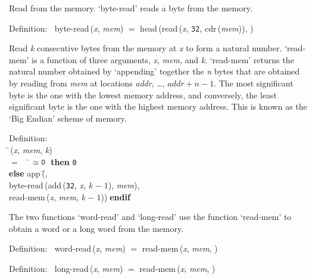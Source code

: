 Read from the memory.
 `byte-read' reads a byte from the memory.
\begin{tabbing}{\sc Definition}:$\;\;$
{\rm{byte-read}}\,({\it{x\/}}, {\it{mem\/}}) $=$ {\rm{head}}\,({\rm{read}}\,({\it{x\/}}, {\tt{32}}, {\rm{cdr}}\,({\it{mem\/}})), {})
\end{tabbing}

 Read {\it{k\/}} consecutive bytes from the memory at {\it{x\/}} to form a natural number.
 `read-mem' is a function of three arguments, {\it{x\/}}, {\it{mem\/}}, and {\it{k\/}}.  
 `read-mem'
 returns the natural number obtained by `appending' together the {\it{n\/}} bytes
 that are obtained by reading from {\it{mem\/}} at locations {\it{addr\/}}, \ldots, 
 $addr+n-1$.  The most significant byte is the one with the lowest
 memory address, and conversely, the least significant byte is the
 one with the highest memory address.  This is known as the `Big Endian'
 scheme of memory.  
\begin{tabbing}{\sc Definition}: \\  
\=\,({\it{x\/}}, {\it{mem\/}}, {\it{k\/}}) \\ 
$=$$\;\;\;\;$\= $\simeq {\tt{0}}$$\;\;${\bf then }{\tt{0}} \\ 
{\bf else }{\rm{app}}\,(\=, \\ 
{\rm{byte-read}}\,({\rm{add}}\,({\tt{32}}, {\it{x\/}}, {\it{k\/}} $-\;1$), {\it{mem\/}}), \\ 
{\rm{read-mem}}\,({\it{x\/}}, {\it{mem\/}}, {\it{k\/}} $-\;1$))\-$\;${\bf  endif}\-\-
\end{tabbing}

 The two functions `word-read' and `long-read' use the function
 `read-mem' to obtain a word or a long word from the memory.
\begin{tabbing}{\sc Definition}:$\;\;$
{\rm{word-read}}\,({\it{x\/}}, {\it{mem\/}}) $=$ {\rm{read-mem}}\,({\it{x\/}}, {\it{mem\/}}, {})
\end{tabbing}

\begin{tabbing}{\sc Definition}:$\;\;$
{\rm{long-read}}\,({\it{x\/}}, {\it{mem\/}}) $=$ {\rm{read-mem}}\,({\it{x\/}}, {\it{mem\/}}, {})
\end{tabbing}

